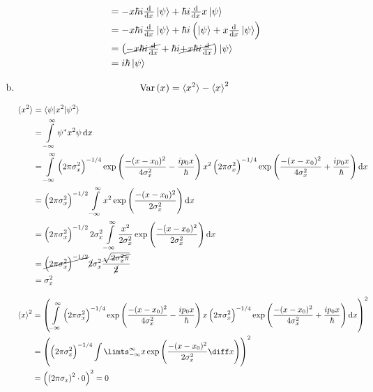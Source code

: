 \documentclass[a4paper,german,12pt,smallheadings]{scrartcl}
\DeclareMathOperator{\Var}{Var}
\begin{document}
\begin{enumerate}[a)]
\begin{align*}
                          &= -x \hbar i \od{}{x} \ket{\psi} + \hbar i \od{}{x} x \ket{\psi} \\
                          &= -x \hbar i \od{}{x} \ket{\psi} + \hbar i \del{\ket{\psi} + x \od{}{x}\ket{\psi}} \\
                          &= \del{\cancel{-x \hbar i \od{}{x}} + \hbar i \cancel{+ x \hbar i \od{}{x}}} \ket{\psi} \\
                          &= i \hbar \ket{\psi}
    \end{align*}
  \item
    \begin{align*}
      \Var\del{x} = \braket{x^2} - \braket{x}^2
    \end{align*}

    \begin{align*}
      \braket{x^2} &= \braket{\psi|x^2|\psi^2} \\
                   &= \int\limits_{-\infty}^{\infty} \psi^* x^2 \psi \dif x \\
                   &= \int\limits_{-\infty}^\infty
      \del{2 \pi \sigma_x^2}^{-1/4} \exp\del{\frac{-(x-x_0)^2}{4 \sigma_x^2} - \frac{ip_0x}{\hbar}}
      x^2
      \del{2 \pi \sigma_x^2}^{-1/4} \exp\del{\frac{-(x-x_0)^2}{4 \sigma_x^2} + \frac{ip_0x}{\hbar}}
      \dif x \\
                   &=
      \del{2 \pi \sigma_x^2}^{-1/2}
      \int\limits_{-\infty}^\infty x^2 \exp\del{\frac{-(x-x_0)^2}{2 \sigma_x^2}} \dif x \\
      &= \del{2 \pi \sigma_x^2}^{-1/2} 2 \sigma_x^2
      \int\limits_{-\infty}^\infty \frac{x^2}{2 \sigma_x^2} \exp\del{\frac{-(x-x_0)^2}{2 \sigma_x^2}} \dif x \\
      &= \cancel{\del{2 \pi \sigma_x^2}^{-1/2}} \cancel{2} \sigma_x^2 \frac{\cancel{\sqrt{2 \sigma_x^2 \pi}}}{\cancel{2}} \\
      &= \sigma_x^2
    \end{align*}

    \begin{align*}
      \braket{x}^2 &= 
      \del{\int\limits_{-\infty}^\infty
      \del{2 \pi \sigma_x^2}^{-1/4} \exp\del{\frac{-(x-x_0)^2}{4 \sigma_x^2} - \frac{ip_0x}{\hbar}}
      x
      \del{2 \pi \sigma_x^2}^{-1/4} \exp\del{\frac{-(x-x_0)^2}{4 \sigma_x^2} + \frac{ip_0x}{\hbar}}
      \dif x}^2 \\
      &= \del{\del{2 \pi \sigma_x^2}^{-1/4} \int\limts_{-\infty}^\infty x \exp\del{\frac{-(x-x_0)^2}{2\sigma_x^2} \diff x}}^2 \\
      &= \del{\del{2 \pi \sigma_x}^2 \cdot 0}^2 = 0
    \end{align*}


\end{enumerate}
\end{document}

